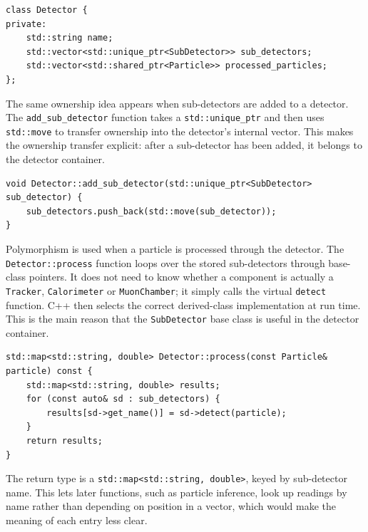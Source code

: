 \documentclass[11pt,a4paper]{article}
\begin{document}
\begin{lstlisting}[caption={Different ownership models in the \texttt{Detector} class.}, label={lst:smartpointers}]
class Detector {
private:
    std::string name;
    std::vector<std::unique_ptr<SubDetector>> sub_detectors;
    std::vector<std::shared_ptr<Particle>> processed_particles;
};
\end{lstlisting}

The same ownership idea appears when sub-detectors are added to a detector. The \texttt{add\_sub\_detector} function takes a \texttt{std::unique\_ptr} and then uses \texttt{std::move} to transfer ownership into the detector's internal vector. This makes the ownership transfer explicit: after a sub-detector has been added, it belongs to the detector container.

\begin{lstlisting}[caption={Transferring ownership of a sub-detector into the detector.}, label={lst:addsubdetector}]
void Detector::add_sub_detector(std::unique_ptr<SubDetector> sub_detector) {
    sub_detectors.push_back(std::move(sub_detector));
}
\end{lstlisting}

Polymorphism is used when a particle is processed through the detector. The \texttt{Detector::process} function loops over the stored sub-detectors through base-class pointers. It does not need to know whether a component is actually a \texttt{Tracker}, \texttt{Calorimeter} or \texttt{MuonChamber}; it simply calls the virtual \texttt{detect} function. C++ then selects the correct derived-class implementation at run time. This is the main reason that the \texttt{SubDetector} base class is useful in the detector container.

\begin{lstlisting}[caption={Processing a particle through polymorphic sub-detectors.}, label={lst:processmap}]
std::map<std::string, double> Detector::process(const Particle& particle) const {
    std::map<std::string, double> results;
    for (const auto& sd : sub_detectors) {
        results[sd->get_name()] = sd->detect(particle);
    }
    return results;
}
\end{lstlisting}

The return type is a \texttt{std::map<std::string, double>}, keyed by sub-detector name. This lets later functions, such as particle inference, look up readings by name rather than depending on position in a vector, which would make the meaning of each entry less clear.
\end{document}
